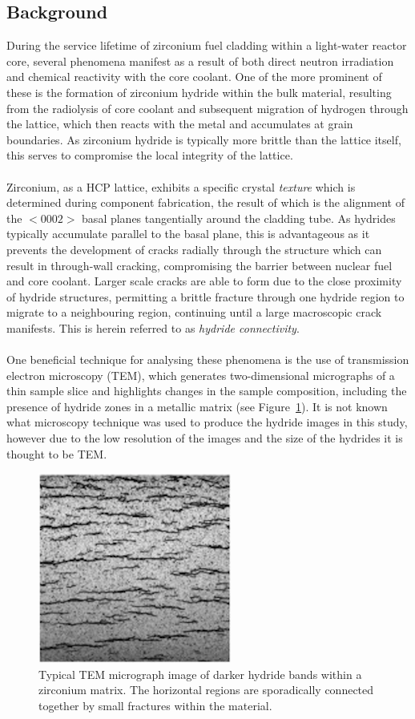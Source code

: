 \documentclass{article}
\begin{document}
	\subsection{Background}
	During the service lifetime of zirconium fuel cladding within a light-water reactor core, several phenomena manifest as a result of both direct neutron irradiation and chemical reactivity with the core coolant. One of the more prominent of these is the formation of zirconium hydride within the bulk material, resulting from the radiolysis of core coolant and subsequent migration of hydrogen through the lattice, which then reacts with the metal and accumulates at grain boundaries. As zirconium hydride is typically more brittle than the lattice itself, this serves to compromise the local integrity of the lattice. 
	\\
	\\
	Zirconium, as a HCP lattice, exhibits a specific crystal \textit{texture} which is determined during component fabrication, the result of which is the alignment of the $<0002>$ basal planes tangentially around the cladding tube. As hydrides typically accumulate parallel to the basal plane, this is advantageous as it prevents the development of cracks radially through the structure which can result in through-wall cracking, compromising the barrier between nuclear fuel and core coolant. Larger scale cracks are able to form due to the close proximity of hydride structures, permitting a brittle fracture through one hydride region to migrate to a neighbouring region, continuing until a large macroscopic crack manifests. This is herein referred to as \textit{hydride connectivity}.
	\\
	\\
	One beneficial technique for analysing these phenomena is the use of transmission electron microscopy (TEM), which generates two-dimensional micrographs of a thin sample slice and highlights changes in the sample composition, including the presence of hydride zones in a metallic matrix (see Figure~\ref{fig:tem_hydride_eg}). It is not known what microscopy technique was used to produce the hydride images in this study, however due to the low resolution of the images and the size of the hydrides it is thought to be TEM.
	\\
	\begin{figure}[h]
		\centering
		\includegraphics[width=2.5in]{Figures/tem_hydride_eg} 
		\caption{Typical TEM micrograph image of darker hydride bands within a zirconium matrix. The horizontal regions are sporadically connected together by small fractures within the material.}
		\label{fig:tem_hydride_eg}
	\end{figure}
\end{document}
